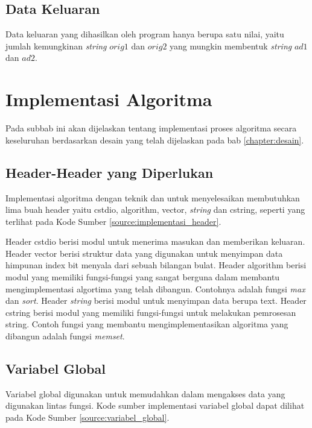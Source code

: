 \subsection{Data Keluaran}
Data keluaran yang dihasilkan oleh program hanya berupa satu nilai, yaitu jumlah kemungkinan \textit{string} $orig1$ dan $ orig2 $ yang mungkin membentuk \textit{string} $ ad1 $ dan $ ad2 $.


\section{Implementasi Algoritma}
Pada subbab ini akan dijelaskan tentang implementasi proses
algoritma secara keseluruhan berdasarkan desain yang telah
dijelaskan pada bab \ref{chapter:desain}.

\subsection{Header-Header yang Diperlukan}
Implementasi algoritma dengan teknik \meetinthemiddle{} dan \dynamicprogramming{} untuk menyelesaikan \problem{} membutuhkan lima buah header yaitu cstdio, algorithm, vector, \textit{string} dan cstring, seperti yang terlihat pada Kode Sumber \ref{source:implementasi_header}.



Header cstdio berisi modul untuk menerima masukan dan
memberikan keluaran. Header vector berisi struktur data yang digunakan untuk menyimpan data himpunan index bit menyala dari sebuah bilangan bulat. Header algorithm berisi modul yang memiliki fungsi-fungsi yang sangat berguna dalam membantu mengimplementasi algortima yang telah dibangun. Contohnya adalah fungsi \textit{max} dan \textit{sort}. Header \textit{string} berisi modul untuk menyimpan data berupa text. Header cstring berisi modul yang memiliki fungsi-fungsi untuk melakukan pemrosesan string. Contoh fungsi yang membantu mengimplementasikan algoritma yang dibangun adalah fungsi \textit{memset}.

\subsection{Variabel Global}
Variabel global digunakan untuk memudahkan dalam mengakses data yang digunakan lintas fungsi. Kode sumber implementasi variabel global dapat dilihat pada Kode Sumber \ref{source:variabel_global}.

